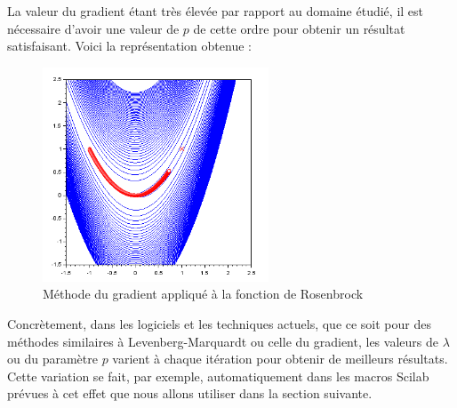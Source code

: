          La valeur du gradient étant très élevée par rapport au domaine étudié, il est nécessaire d'avoir une valeur de $p$ de cette ordre pour obtenir un résultat satisfaisant. Voici la représentation obtenue :
         \newpage
         \begin{figure}[H]
              \centering
                \includegraphics[width=0.6\textwidth]{images/gradient.png}
              \caption{Méthode du gradient appliqué à la fonction de Rosenbrock}
              \label{fig:grad1}
            \end{figure}
            Concrètement, dans les logiciels et les techniques actuels, que ce soit pour des méthodes similaires à Levenberg-Marquardt ou celle du gradient, les valeurs de $\lambda$ ou du paramètre $p$ varient à chaque itération pour obtenir de meilleurs résultats. Cette variation se fait, par exemple, automatiquement dans les macros Scilab prévues à cet effet que nous allons utiliser dans la section suivante.
